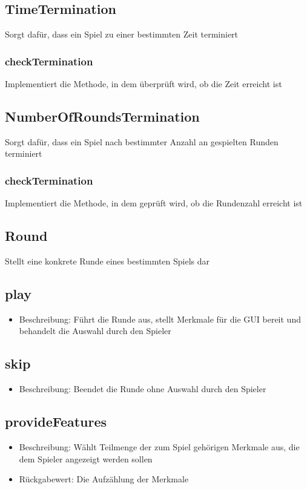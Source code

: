 \documentclass[a4paper]{scrreprt}
\begin{document}
   
   \subsection{TimeTermination}
   Sorgt dafür, dass ein Spiel zu einer bestimmten Zeit terminiert
   \subsubsection{checkTermination}
      Implementiert die Methode, in dem überprüft wird, ob die Zeit erreicht ist
     
   \subsection{NumberOfRoundsTermination}
   Sorgt dafür, dass ein Spiel nach bestimmter Anzahl an gespielten Runden terminiert
   \subsubsection{checkTermination}
      Implementiert die Methode, in dem geprüft wird, ob die Rundenzahl erreicht ist
   
   \subsection{Round}
   Stellt eine konkrete Runde eines bestimmten Spiels dar
   \subsection{play}
   \begin{itemize}
   \item Beschreibung: Führt die Runde aus, stellt Merkmale für die GUI bereit und behandelt die Auswahl durch den Spieler
   \end{itemize}
   \subsection{skip}
      \begin{itemize}
      \item Beschreibung: Beendet die Runde ohne Auswahl durch den Spieler
      \end{itemize}
   \subsection{provideFeatures}
      \begin{itemize}
      \item Beschreibung: Wählt Teilmenge der zum Spiel gehörigen Merkmale aus, die dem Spieler angezeigt werden sollen
      \item Rückgabewert: Die Aufzählung der Merkmale
      \end{itemize}
\end{document}
